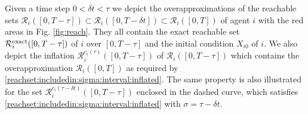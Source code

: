 \documentclass[reqno]{amsart}
\theoremstyle{plain}
\theoremstyle{definition}
\numberwithin{equation}{section}
\begin{document}
\noindent Given a time step $0<\delta t<\tau$ we  depict the overapproximations of the reachable sets ${\ensuremath{\mathcal{R}}}_i([0,T-\tau])\subset {\ensuremath{\mathcal{R}}}_i([0,T-\delta t])\subset{\ensuremath{\mathcal{R}}}_i([0,T])$ of agent $i$ with the red areas in Fig. \ref{fig:reach}. They all contain the exact reachable set ${\ensuremath{\mathcal{R}}}_i^{\rm exact}([0,T-\tau])$ of $i$ over $[0,T-\tau]$ and the initial condition $X_{i0}$ of $i$. We also depict the inflation  ${\ensuremath{\mathcal{R}}}_i^{c_i(\tau)}([0,T-\tau])$ of ${\ensuremath{\mathcal{R}}}_i([0,T-\tau])$ which contains the overapproximation ${\ensuremath{\mathcal{R}}}_i([0,T])$ as required by \eqref{reachset:includedin:sigma:interval:inflated}. The same property is also illustrated for the set ${\ensuremath{\mathcal{R}}}_i^{c_i(\tau-\delta t)}([0,T-\tau])$ enclosed in the dashed curve, which satisfies \eqref{reachset:includedin:sigma:interval:inflated} with $\sigma=\tau-\delta t$. 
\end{document}
